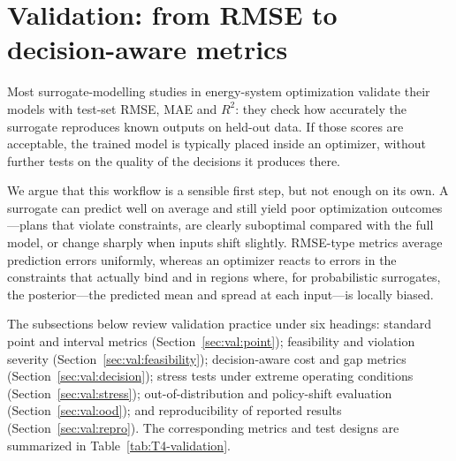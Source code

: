 \section{Validation: from RMSE to decision-aware metrics}
\label{sec:validation}

Most surrogate-modelling studies in energy-system optimization validate
their models with test-set RMSE, MAE and $R^{2}$: they check how
accurately the surrogate reproduces known outputs on held-out data.
If those scores are acceptable, the trained model is typically placed
inside an optimizer, without further tests on the quality of the
decisions it produces there.

We argue that this workflow is a sensible first step, but not enough
on its own. A surrogate can predict well on average and still yield
poor optimization outcomes---plans that violate constraints, are
clearly suboptimal compared with the full model, or change sharply
when inputs shift slightly. RMSE-type metrics average prediction
errors uniformly, whereas an optimizer reacts to errors in the
constraints that actually bind and in regions where, for probabilistic
surrogates, the posterior---the predicted mean and spread at each
input---is locally biased.

The subsections below review validation practice under six headings:
standard point and interval metrics (Section~\ref{sec:val:point});
feasibility and violation severity (Section~\ref{sec:val:feasibility});
decision-aware cost and gap metrics (Section~\ref{sec:val:decision});
stress tests under extreme operating conditions
(Section~\ref{sec:val:stress}); out-of-distribution and policy-shift
evaluation (Section~\ref{sec:val:ood}); and reproducibility of
reported results (Section~\ref{sec:val:repro}). The corresponding
metrics and test designs are summarized in
Table~\ref{tab:T4-validation}.

